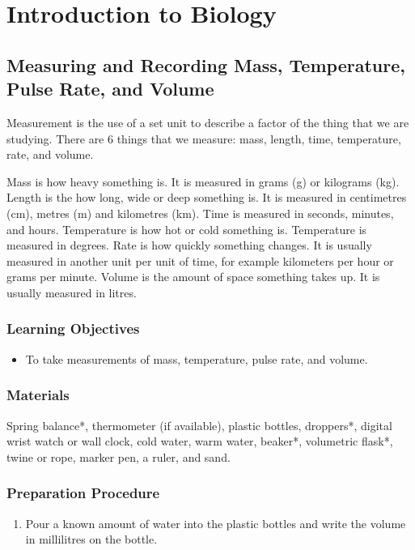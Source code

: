 \section{Introduction to Biology}

\subsection{Measuring and Recording Mass, Temperature, Pulse Rate, and Volume}
Measurement is the use of a set unit to describe a factor of the thing that we are studying. There are 6 things that we measure: mass, length, time, temperature, rate, and volume.

Mass is how heavy something is. It is measured in grams (g) or kilograms (kg). Length is the how long, wide or deep something is. It is measured in centimetres (cm), metres (m) and kilometres (km). Time is measured in seconds, minutes, and hours. Temperature is how hot or cold something is. Temperature is measured in degrees. Rate is how quickly something changes. It is usually measured in another unit per unit of time, for example kilometers per hour or grams per minute. Volume is the amount of space something takes up. It is usually measured in litres.

\subsubsection*{Learning Objectives}
\begin{itemize}
\item{To take measurements of mass, temperature, pulse rate, and volume.}
\end{itemize}

\subsubsection*{Materials}
Spring balance*, thermometer (if available), plastic bottles, droppers*, digital wrist watch or wall clock, cold water, warm water, beaker*, volumetric flask*, twine or rope, marker pen, a ruler, and sand.

\subsubsection*{Preparation Procedure}
\begin{enumerate}
\item{Pour a known amount of water into the plastic bottles and write the volume in millilitres on the bottle.}
\end{enumerate}

